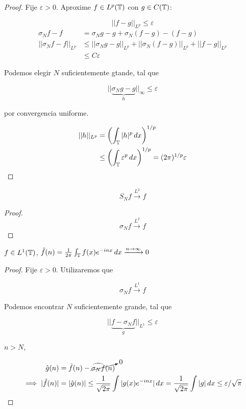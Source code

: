 \begin{proof}
    Fije $\varepsilon>0$. Aproxime $f\in L^p(\mathbb{T})$ con $g\in C(\mathbb{T})$:

    \[||f-g||_{L^p}\leq \varepsilon\]
    \begin{align*}
        \sigma_N f-f&=\sigma_N g-g +\sigma_N (f-g)-(f-g)\\
        ||\sigma_N f-f||_{L^p}&\leq ||\sigma_N g-g||_{L^p}+||\sigma_N (f-g)||_{L^p}+||f-g||_{L^p}\\
        &\leq C\varepsilon
    \end{align*}

    Podemos elegir $N$ suficientemente gtande, tal que 

    \[||\underbrace{\sigma_N g-g}_{h}||_{\infty}\leq \varepsilon\]

    por convergencia uniforme.

    \begin{align*}
        ||h||_{L^p}&=\left(\int_{\mathbb{T}} |h|^p\,dx\right)^{1/p}\\
        &\leq \left(\int_{\mathbb{T}} \varepsilon^p\,dx\right)^{1/p}=(2\pi)^{1/p}\varepsilon
    \end{align*}
\end{proof}

\begin{fcorollary}
    \[S_N f\xrightarrow{L^2} f\]
\end{fcorollary}

\begin{proof}
    \[\sigma_N f\xrightarrow{L^2}f\]
\end{proof}

\begin{flemma}
    $f\in L^1(\mathbb{T})$, $\hat f(n)=\frac{1}{2\pi}\int_{\mathbb{T}} f(x)e^{-inx}\,dx\xrightarrow{n\to\infty} 0$
\end{flemma}

\begin{proof}
    Fije $\varepsilon>0$. Utilizaremos que 

    \[\sigma_N f\xrightarrow{L^1}f\]

    Podemos encontrar $N$ suficientemente grande, tal que

    \[||\underbrace{f-\sigma_N f}_{g}||_{L^1}\leq \varepsilon\]

    $n>N$,

    \begin{align*}
        \hat g(n)&=\hat f(n)-\cancelto{0}{\widehat{\sigma_N f}(n)}\\
        \implies |\hat f(n)|&=|\hat g(n)|\leq \frac{1}{\sqrt{2\pi}}\int |g(x)e^{-inx}|\,dx=\frac{1}{\sqrt{2\pi}}\int |g|\,dx\leq \varepsilon/\sqrt{\pi}
    \end{align*}
\end{proof}

